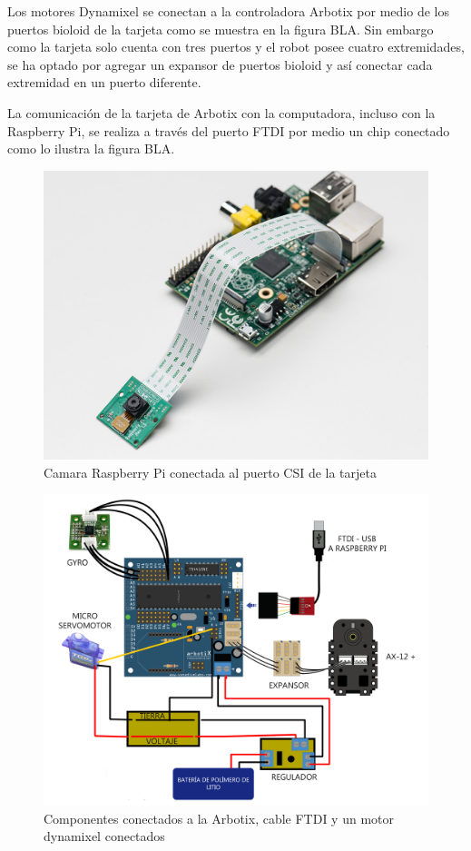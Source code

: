 Los motores Dynamixel se conectan a la controladora Arbotix por medio de los puertos bioloid de la tarjeta como se muestra en la figura BLA. Sin embargo como la tarjeta solo cuenta con tres puertos y el robot posee cuatro extremidades, se ha optado por agregar un expansor de puertos bioloid y así conectar cada extremidad en un puerto diferente. 

La comunicación de la tarjeta de Arbotix con la computadora, incluso con la Raspberry Pi, se realiza a través del puerto FTDI por medio un chip conectado como lo ilustra la figura BLA.

\begin{figure}[hbtp]
\centering
\includegraphics[scale=1]{imagenes/raspbCam.jpg}
\caption{Camara Raspberry Pi conectada al puerto CSI de la tarjeta}
\end{figure}


\begin{figure}[hbtp]
\centering
\includegraphics[scale=0.2]{imagenes/arbotix_servo.png}
\caption{Componentes conectados a la Arbotix, cable FTDI y un motor dynamixel conectados }
\end{figure}

